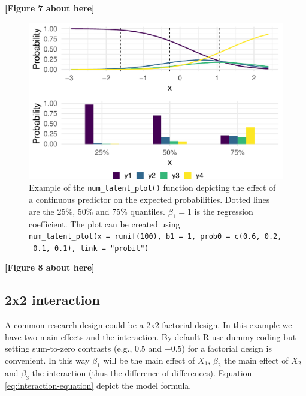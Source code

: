 \documentclass[
  man,floatsintext]{apa6}
\begin{document}
\begin{center}\textbf{[Figure 7 about here]} \end{center}

\normalsize

\scriptsize

\begin{figure}

{\centering \includegraphics[width=1\linewidth]{paper_files/figure-latex/fig-example-num-latent-1} 

}

\caption{Example of the \texttt{num\_latent\_plot()} function depicting the effect of a continuous predictor on the expected probabilities. Dotted lines are the 25\%, 50\% and 75\% quantiles. \(\beta_1 = 1\) is the regression coefficient. The plot can be created using \texttt{num\_latent\_plot(x\ =\ runif(100),\ b1\ =\ 1,\ prob0\ =\ c(0.6,\ 0.2,\ 0.1,\ 0.1),\ link\ =\ "probit")}}\label{fig:fig-example-num-latent}
\end{figure}

\begin{center}\textbf{[Figure 8 about here]} \end{center}

\normalsize

\subsection{2x2 interaction}\label{x2-interaction}

A common research design could be a 2x2 factorial design. In this example we have two main effects and the interaction. By default R use dummy coding but setting sum-to-zero contrasts (e.g., \(0.5\) and \(-0.5\)) for a factorial design is convenient. In this way \(\beta_1\) will be the main effect of \(X_1\), \(\beta_2\) the main effect of \(X_2\) and \(\beta_3\) the interaction (thus the difference of differences). Equation \eqref{eq:interaction-equation} depict the model formula.
\end{document}
